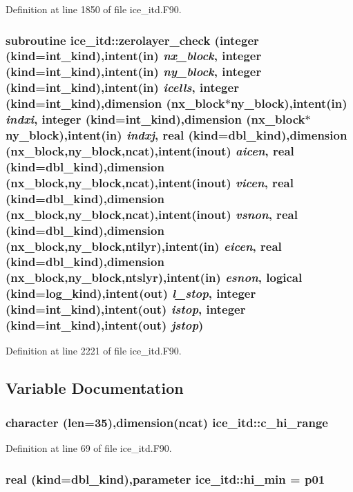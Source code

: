 Definition at line 1850 of file ice\_\-itd.F90.\hypertarget{namespaceice__itd_a55c2adda4305308869dac586cefe447a}{
\subsubsection[{zerolayer\_\-check}]{\setlength{\rightskip}{0pt plus 5cm}subroutine ice\_\-itd::zerolayer\_\-check (integer (kind=int\_\-kind),intent(in) {\em nx\_\-block}, \/  integer (kind=int\_\-kind),intent(in) {\em ny\_\-block}, \/  integer (kind=int\_\-kind),intent(in) {\em icells}, \/  integer (kind=int\_\-kind),dimension (nx\_\-block$\ast$ny\_\-block),intent(in) {\em indxi}, \/  integer (kind=int\_\-kind),dimension (nx\_\-block$\ast$ny\_\-block),intent(in) {\em indxj}, \/  real (kind=dbl\_\-kind),dimension (nx\_\-block,ny\_\-block,ncat),intent(inout) {\em aicen}, \/  real (kind=dbl\_\-kind),dimension (nx\_\-block,ny\_\-block,ncat),intent(inout) {\em vicen}, \/  real (kind=dbl\_\-kind),dimension (nx\_\-block,ny\_\-block,ncat),intent(inout) {\em vsnon}, \/  real (kind=dbl\_\-kind),dimension (nx\_\-block,ny\_\-block,ntilyr),intent(in) {\em eicen}, \/  real (kind=dbl\_\-kind),dimension (nx\_\-block,ny\_\-block,ntslyr),intent(in) {\em esnon}, \/  logical (kind=log\_\-kind),intent(out) {\em l\_\-stop}, \/  integer (kind=int\_\-kind),intent(out) {\em istop}, \/  integer (kind=int\_\-kind),intent(out) {\em jstop})}}
\label{namespaceice__itd_a55c2adda4305308869dac586cefe447a}


Definition at line 2221 of file ice\_\-itd.F90.

\subsection{Variable Documentation}
\hypertarget{namespaceice__itd_a679cef320723f15b41bdfc5811701cea}{
\subsubsection[{c\_\-hi\_\-range}]{\setlength{\rightskip}{0pt plus 5cm}character (len=35),dimension(ncat) {\bf ice\_\-itd::c\_\-hi\_\-range}}}
\label{namespaceice__itd_a679cef320723f15b41bdfc5811701cea}


Definition at line 69 of file ice\_\-itd.F90.\hypertarget{namespaceice__itd_a096dec1f870d22da21163b6dcacb1d2c}{
\subsubsection[{hi\_\-min}]{\setlength{\rightskip}{0pt plus 5cm}real (kind=dbl\_\-kind),parameter {\bf ice\_\-itd::hi\_\-min} = p01}}
\label{namespaceice__itd_a096dec1f870d22da21163b6dcacb1d2c}


